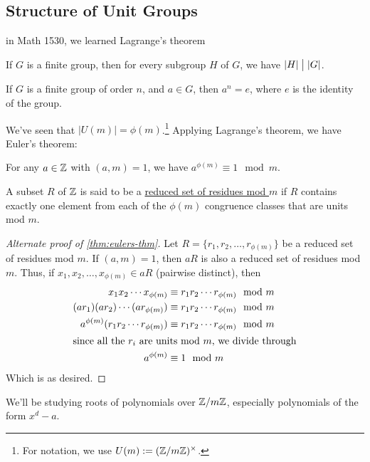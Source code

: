 \subsection{Structure of Unit Groups}
\recall in Math 1530, we learned Lagrange's theorem
\begin{theorem}
    If $G$ is a finite group, then for every subgroup $H$ of $G$, we have $|H| \bigm\vert |G|$.
\end{theorem}
\begin{corollary}
    If $G$ is a finite group of order $n$, and $a\in G$, then $a^n = e$, where $e$ is the identity of the group.
\end{corollary}
We've seen that $\left\vert U(m) \right\vert = \phi(m)$.\footnote{For notation, we use $U(m) := (\mathbb Z/m\mathbb Z)^\times$.} Applying Lagrange's theorem, we have Euler's theorem:
\begin{theorem}\label{thm:eulers-thm}
    For any $a\in \mathbb Z$ with $(a, m) = 1$, we have $a^{\phi(m)}\equiv 1\mod{m}$.
\end{theorem}
\begin{definition}
    A subset $R$ of $\mathbb Z$ is said to be a \ul{reduced set of residues mod $m$} if $R$ contains exactly one element from each of the $\phi(m)$ congruence classes that are units mod $m$.
\end{definition}
\begin{proof}[Alternate proof of \cref{thm:eulers-thm}]
    Let $R = \{r_1, r_2, \dots, r_{\phi(m)}\}$ be a reduced set of residues mod $m$. If $(a, m) = 1$, then $aR$ is also a reduced set of residues mod $m$. Thus, if $x_1, x_2, \dots, x_{\phi(m)}\in aR$ (pairwise distinct), then
    \begin{align*}
        x_1x_2\cdots x_{\phi(m)}               & \equiv r_1r_2\cdots r_{\phi(m)}\mod{m}  \\
        (ar_1)(ar_2)\cdots (ar_{\phi(m)})      & \equiv r_1r_2\cdots r_{\phi(m)}\mod{m}  \\
        a^{\phi(m)} (r_1r_2\cdots r_{\phi(m)}) & \equiv r_1r_2\cdots r_{\phi(m)} \mod{m} \\
        \intertext{since all the $r_i$ are units mod $m$, we divide through}
        a^{\phi(m)}                            & \equiv 1\mod{m}
    \end{align*}
    Which is as desired.
\end{proof}

We'll be studying roots of polynomials over $\mathbb Z/m\mathbb Z$, especially polynomials of the form $x^d - a$.

